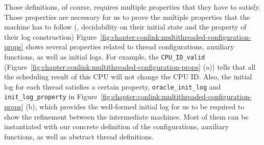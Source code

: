 Those definitions, of course, requires multiple properties that they have to satisfy.
Those properties are necessary for us to prove the multiple properties that the machine has to follow (\eg, decidability on their initial state and the property of their log construction)  
Figure~\ref{fig:chapter:conlink:multithreaded-configuration-props} shows several properties related to thread configurations, auxiliary functions, as well as initial logs.
For example, 
the \lstinline$CPU_ID_valid$ (Figure~\ref{fig:chapter:conlink:multithreaded-configuration-props} (a))
tells that all the scheduling result of this CPU 
will not change the CPU ID. 
Also, the initial log for each thread satisfies a certain property, \lstinline$oracle_init_log$ and \lstinline$init_log_property$
in Figure~\ref{fig:chapter:conlink:multithreaded-configuration-props} (b),
which provides the well-formed initial log for us to be required to show the 
refinement between the intermediate machines. 
Most of them can be instantiated with our concrete definition of the configurations, auxiliary functions,
as well as abstract thread definitions. 




%

